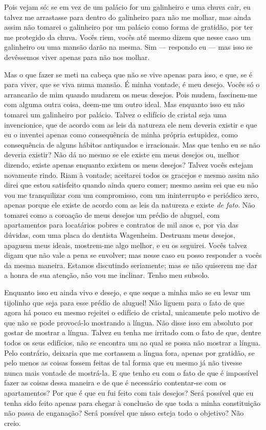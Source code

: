 Pois vejam só: se em vez de um palácio for um galinheiro e uma chuva
cair, eu talvez me arrastasse para dentro do galinheiro para não me
molhar, mas ainda assim não tomarei o galinheiro por um palácio como
forma de gratidão, por ter me protegido da chuva. Vocês riem, vocês até
mesmo dizem que nesse caso um galinheiro ou uma mansão darão na mesma.
Sim --- respondo eu --- mas isso se devêssemos viver apenas para não nos
molhar.

Mas o que fazer se meti na cabeça que não se vive apenas para isso, e
que, se é para viver, que se viva numa mansão. É minha vontade, é meu
desejo. Vocês só o arrancarão de mim quando mudarem os meus desejos.
Pois mudem, fascinem-me com alguma outra coisa, deem-me um outro ideal.
Mas enquanto isso eu não tomarei um galinheiro por palácio. Talvez o
edifício de cristal seja uma invencionice, que de acordo com as leis da
natureza ele nem deveria existir e que eu o inventei apenas como
consequência de minha própria estupidez, como consequência de alguns
hábitos antiquados e irracionais. Mas que tenho eu se não deveria
existir? Não dá no mesmo se ele existe em meus desejos ou, melhor
dizendo, existe apenas enquanto existem os meus desejos? Talvez vocês
estejam novamente rindo. Riam à vontade; aceitarei todos os gracejos e
mesmo assim não direi que estou satisfeito quando ainda quero comer;
mesmo assim sei que eu não vou me tranquilizar com um compromisso, com
um ininterrupto e periódico zero, apenas porque ele existe de acordo
com as leis da natureza e existe \textit{de fato}.
Não tomarei como a coroação de meus desejos um prédio de aluguel, com
apartamentos para locatários pobres e contratos de mil anos e, por via
das dúvidas, com uma placa do dentista Wagenheim. Destruam meus
desejos, apaguem meus ideais, mostrem-me algo melhor, e eu os seguirei.
Vocês talvez digam que não vale a pena se envolver; mas nesse caso eu
posso responder a vocês da mesma maneira. Estamos discutindo
seriamente; mas se não quiserem me dar a honra de sua atenção, não vou
me inclinar. Tenho meu subsolo.

Enquanto isso eu ainda vivo e desejo, e que seque a minha mão se eu
levar um tijolinho que seja para esse prédio de aluguel! Não liguem
para o fato de que agora há pouco eu mesmo rejeitei o edifício de
cristal, unicamente pelo motivo de que não se pode provocá-lo mostrando
a língua. Não disse isso em absoluto por gostar de mostrar a língua.
Talvez eu tenha me irritado com o fato de que, dentre todos os seus
edifícios, não se encontra um ao qual se possa não mostrar a língua.
Pelo contrário, deixaria que me cortassem a língua fora, apenas por
gratidão, se pelo menos as coisas fossem feitas de tal forma que eu
mesmo já não tivesse nunca mais vontade de mostrá-la. E que tenho eu
com o fato de que é impossível fazer as coisas dessa maneira e de que é
necessário contentar-se com os apartamentos? Por que é que eu fui feito
com tais desejos? Será possível que eu tenha sido feito apenas para
chegar à conclusão de que toda a minha constituição não passa de
enganação? Será possível que nisso esteja todo o objetivo? Não creio.

